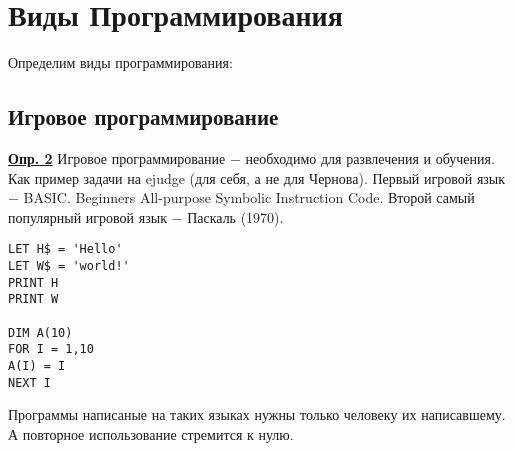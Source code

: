 \documentclass[a4paper, 12pt, titlepage, finall]{extreport}
\begin{document}
    \chapter{Виды Программирования}
        Определим виды программирования:
        \section{Игровое программирование}
            \underline{\bf Опр. 2} Игровое программирование $-$ необходимо для развлечения и обучения.\\
            Как пример задачи на ejudge (для себя, а не для Чернова).
            Первый игровой язык $-$ BASIC. Beginners All-purpose Symbolic Instruction Code.
            Второй самый популярный игровой язык $-$ Паскаль (1970).
\begin{lstlisting}
LET H$ = 'Hello'
LET W$ = 'world!'
PRINT H
PRINT W

DIM A(10)
FOR I = 1,10
A(I) = I
NEXT I
\end{lstlisting}
            Программы написаные на таких языках нужны только человеку их написавшему. А повторное использование стремится к нулю.
\end{document}
